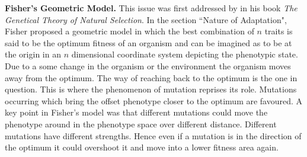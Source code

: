 \documentclass[oneside,11pt,a4paper]{book}
\begin{document}
\textbf{Fisher's Geometric Model.}
This issue was first addressed by \citet{fisher:1930fi} in his book \textit{The Genetical Theory of Natural Selection}.
In the section ``Nature of Adaptation", Fisher proposed a geometric model in which the best combination of $n$ traits is said to be the optimum fitness of an organism and can be imagined as to be at the origin in an $n$ dimensional coordinate system depicting the phenotypic state.
Due to a some change in the organism or the environment the organism moves away from the optimum.
The way of reaching back to the optimum is the one in question.
This is where the phenomenon of mutation reprises its role.
Mutations occurring which bring the offset phenotype closer to the optimum are favoured.
A key point in Fisher's model was that different mutations could move the phenotype around in the phenotype space over different distance.
Different mutations have different strengths.
Hence even if a mutation is in the direction of the optimum it could overshoot it and move into a lower fitness area again.
\end{document}
